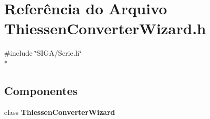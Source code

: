 \section{Referência do Arquivo Thiessen\+Converter\+Wizard.\+h}
\label{_thiessen_converter_wizard_8h}
{\ttfamily \#include \char`\"{}S\+I\+G\+A/\+Serie.\+h\char`\"{}}\\*
\subsection*{Componentes}
\begin{DoxyCompactItemize}
\item 
class {\bf Thiessen\+Converter\+Wizard}
\end{DoxyCompactItemize}
